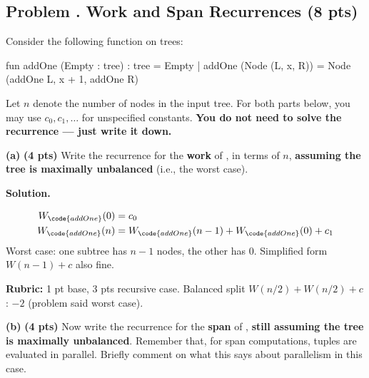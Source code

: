 \documentclass[crop=false]{standalone}
\newif\ifsol
\newenvironment{solution}
    {\par\color{solution_color}\begin{framed}\textbf{Solution.}\par}
    {\end{framed}}
\newcommand{\quizproblem}[3]{%
  \needspace{5\baselineskip}%
  \stepcounter{problem}%
  \ifsol
    \subsection*{Problem \arabic{problem}. #1 \hfill \timing{#2} \quad (#3 pts)}%
  \else
    \subsection*{Problem \arabic{problem}. #1 \hfill (#3 pts)}%
  \fi
}
\newcommand{\subpts}[1]{\textbf{(#1 pts)}}
\newcommand{\answerspace}[1]{\ifsol\else\vspace{#1}\par\fi}
\begin{document}
\vspace{1em}
\quizproblem{Work and Span Recurrences}{7}{8}

Consider the following function on trees:

\begin{codeblock}
  fun addOne (Empty : tree) : tree = Empty
    | addOne (Node (L, x, R)) = Node (addOne L, x + 1, addOne R)
\end{codeblock}

Let $n$ denote the number of nodes in the input tree. For both parts
below, you may use $c_0, c_1, \ldots$ for unspecified constants.
\textbf{You do not need to solve the recurrence --- just write it down.}

\vspace{0.5em}

\textbf{(a)} \subpts{4} Write the recurrence for the \textbf{work} of
, in terms of $n$, \textbf{assuming the tree is maximally
unbalanced} (i.e., the worst case).

\answerspace{3.5cm}

\begin{solution}
\begin{align*}
  W_{\code{addOne}}(0) &= c_0 \\
  W_{\code{addOne}}(n) &= W_{\code{addOne}}(n - 1) + W_{\code{addOne}}(0) + c_1
\end{align*}
Worst case: one subtree has $n-1$ nodes, the other has $0$. Simplified
form $W(n-1) + c$ also fine.

\textbf{Rubric:} 1 pt base, 3 pts recursive case. Balanced split
$W(n/2) + W(n/2) + c$: $-2$ (problem said worst case).
\end{solution}

\vspace{0.5em}

\textbf{(b)} \subpts{4} Now write the recurrence for the \textbf{span} of
, \textbf{still assuming the tree is maximally unbalanced}.
Remember that, for span computations, tuples are evaluated in parallel.
Briefly comment on what this says about parallelism in this case.

\answerspace{4cm}
\end{document}
